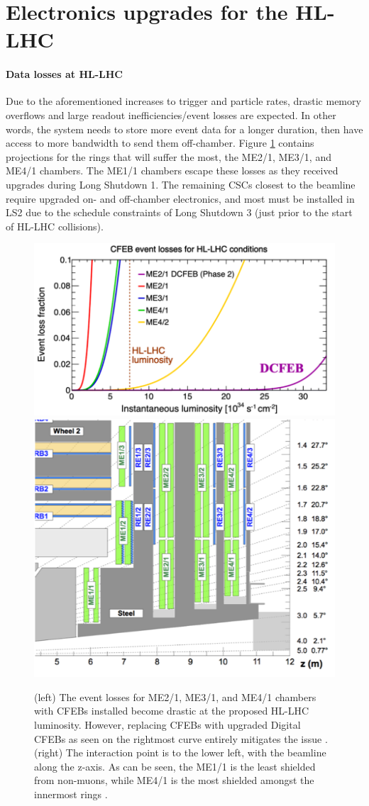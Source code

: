\documentclass[a4paper,11pt]{article}
\begin{document}
\section{Electronics upgrades for the HL-LHC}
\label{sec:electronics}
\paragraph{Data losses at HL-LHC}
Due to the aforementioned increases to trigger and particle rates, drastic memory overflows and large readout inefficiencies/event losses are expected. In other words, the system needs to store more event data for a longer duration, then have access to more bandwidth to send them off-chamber. Figure \ref{fig:EventLoss} contains projections for the rings that will suffer the most, the ME2/1, ME3/1, and ME4/1 chambers. The ME1/1 chambers escape these losses as they received upgrades during Long Shutdown 1. The remaining CSCs closest to the beamline require upgraded on- and off-chamber electronics, and most must be installed in LS2 due to the schedule constraints of Long Shutdown 3 (just prior to the start of HL-LHC collisions).

\begin{figure}[htbp]
\centering %
\includegraphics[width=.55\textwidth]{EventLoss.png}
\qquad
\includegraphics[width=.35\textwidth]{Diagram.png}
\caption{\label{fig:EventLoss} (left) The event losses for ME2/1, ME3/1, and ME4/1 chambers with CFEBs installed become drastic at the proposed HL-LHC luminosity. However, replacing CFEBs with upgraded Digital CFEBs as seen on the rightmost curve entirely mitigates the issue \cite{tdr}. (right) The interaction point is to the lower left, with the beamline along the z-axis. As can be seen, the ME1/1 is the least shielded from non-muons, while ME4/1 is the most shielded amongst the innermost rings \cite{performance}. }
\end{figure}
\end{document}
